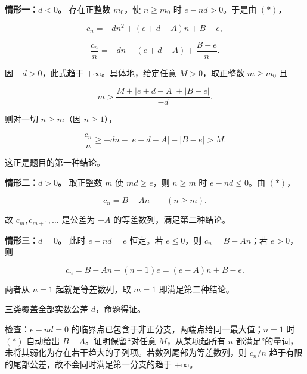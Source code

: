 \begin{answer}
\textbf{情形一：$d<0$。} 存在正整数 $m_0$，使 $n\geqslant m_0$ 时 $e-nd>0$。于是由 $(*)$，

\nopagebreak[4]
\[c_n=-dn^2+(e+d-A)n+B-e,\]

\nopagebreak[4]
\[\frac{c_n}{n}=-dn+(e+d-A)+\frac{B-e}{n}.\]

因 $-d>0$，此式趋于 $+\infty$。具体地，给定任意 $M>0$，取正整数 $m\geqslant m_0$ 且

\nopagebreak[4]
\[m>\frac{M+|e+d-A|+|B-e|}{-d}.\]

则对一切 $n\geqslant m$（因 $n\geqslant1$），

\nopagebreak[4]
\[\frac{c_n}{n}\geqslant-dn-|e+d-A|-|B-e|>M.\]

这正是题目的第一种结论。

\textbf{情形二：$d>0$。} 取正整数 $m$ 使 $md\geqslant e$，则 $n\geqslant m$ 时 $e-nd\leqslant0$。由 $(*)$，

\nopagebreak[4]
\[c_n=B-An\qquad(n\geqslant m).\]

故 $c_m,c_{m+1},\ldots$ 是公差为 $-A$ 的等差数列，满足第二种结论。

\textbf{情形三：$d=0$。} 此时 $e-nd=e$ 恒定。若 $e\leqslant0$，则 $c_n=B-An$；若 $e>0$，则

\nopagebreak[4]
\[c_n=B-An+(n-1)e=(e-A)n+B-e.\]

两者从 $n=1$ 起就是等差数列，取 $m=1$ 即满足第二种结论。

三类覆盖全部实数公差 $d$，命题得证。

检查：$e-nd=0$ 的临界点已包含于非正分支，两端点给同一最大值；$n=1$ 时 $(*)$ 自动给出 $B-A$。证明保留“对任意 $M$，从某项起所有 $n$ 都满足”的量词，未将其弱化为存在若干趋大的子列项。若数列尾部为等差数列，则 $c_n/n$ 趋于有限的尾部公差，故不会同时满足第一分支的趋于 $+\infty$。



\end{answer}